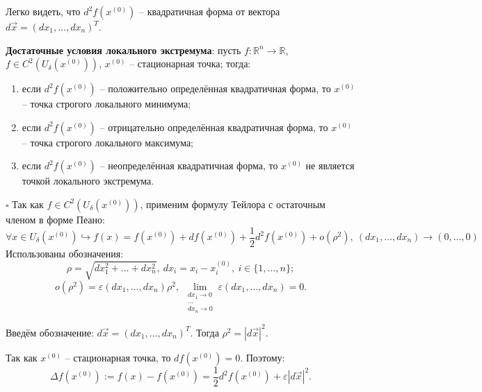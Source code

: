 \documentclass[12pt, a4paper, reqno]{article}
\begin{document}
    Легко видеть, что $d^2 f(x^{(0)})$ -- квадратичная форма от вектора
    $d\vec{x} = (dx_1, \ldots, dx_n)^T$.

    \textbf{Достаточные условия локального экстремума}: пусть $f: \mathbb{R}^n \to \mathbb{R}$,
    $f \in C^2(U_{\delta}(x^{(0)}))$, $x^{(0)}$ -- стационарная точка; тогда:
    \begin{enumerate}
        \item если $d^2 f(x^{(0)})$ -- положительно определённая квадратичная форма, то $x^{(0)}$ --
              точка строгого локального минимума;
        \item если $d^2 f(x^{(0)})$ -- отрицательно определённая квадратичная форма, то $x^{(0)}$ --
              точка строгого локального максимума;
        \item если $d^2 f(x^{(0)})$ -- неопределённая квадратичная форма, то $x^{(0)}$ не является
              точкой локального экстремума.
    \end{enumerate}

    $\square$
    Так как $f \in C^2(U_{\delta}(x^{(0)}))$, применим формулу Тейлора с остаточным членом в форме
    Пеано:
    \begin{equation*}
        \forall x \in U_{\delta}(x^{(0)}) \hookrightarrow
        f(x) = f(x^{(0)}) + df(x^{(0)}) + \frac{1}{2}d^2 f(x^{(0)}) + o(\rho^2),\
        (dx_1, \ldots, dx_n) \to (0, \ldots, 0)
    \end{equation*}
    Использованы обозначения:
    \begin{equation*}
        \rho = \sqrt{dx_1^2 + \ldots + dx_n^2},\ dx_i = x_i - x_i^{(0)},\ i \in \{1, \ldots, n\};
    \end{equation*}
    \begin{equation*}
        o(\rho^2) = \varepsilon(dx_1, \ldots, dx_n) \rho^2,\
        \lim\limits_{\substack{dx_1 \to 0 \\ \ldots \\ dx_n \to 0}} \varepsilon(dx_1, \ldots, dx_n) = 0.
    \end{equation*}

    Введём обозначение: $d\vec{x} = (dx_1, \ldots, dx_n)^T$. Тогда $\rho^2 = |d\vec{x}|^2$.

    Так как $x^{(0)}$ -- стационарная точка, то $df(x^{(0)}) = 0$. Поэтому:
    \begin{equation*}
        \Delta f(x^{(0)}) := f(x) - f(x^{(0)}) = \frac{1}{2}d^2 f(x^{(0)}) + \varepsilon |d\vec{x}|^2.
    \end{equation*}
\end{document}
